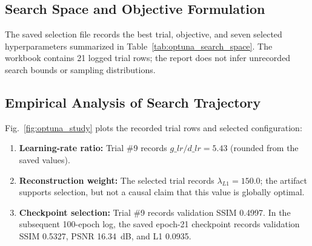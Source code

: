 \documentclass[journal,compsoc]{IEEEtran}
\begin{document}
\begin{table}[!t]
\caption{Saved Task 4 Optuna Selection (Trial \#9)}
\label{tab:optuna_search_space}
\centering
{}
\end{table}

\subsection{Search Space and Objective Formulation}
The saved selection file records the best trial, objective, and seven selected hyperparameters summarized in Table~\ref{tab:optuna_search_space}. The workbook contains 21 logged trial rows; the report does not infer unrecorded search bounds or sampling distributions.

\subsection{Empirical Analysis of Search Trajectory}
Fig.~\ref{fig:optuna_study} plots the recorded trial rows and selected configuration:
\begin{enumerate}
    \item \textbf{Learning-rate ratio:} Trial \#9 records $g\_lr/d\_lr=5.43$ (rounded from the saved values).
    \item \textbf{Reconstruction weight:} The selected trial records $\lambda_{L1}=150.0$; the artifact supports selection, but not a causal claim that this value is globally optimal.
    \item \textbf{Checkpoint selection:} Trial \#9 records validation SSIM 0.4997. In the subsequent 100-epoch log, the saved epoch-21 checkpoint records validation SSIM 0.5327, PSNR 16.34~dB, and L1 0.0935.
\end{enumerate}
\end{document}
